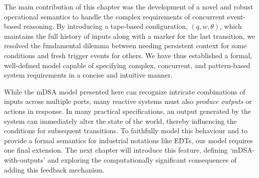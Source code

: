 The main contribution of this chapter was the development of a novel and robust operational semantics to handle the complex requirements of concurrent event-based reasoning. By introducing a tape-based configuration, $(q, w, \theta)$, which maintains the full history of inputs along with a marker for the last transition, we resolved the fundamental dilemma between needing persistent context for some conditions and fresh trigger events for others. We have thus established a formal, well-defined model capable of specifying complex, concurrent, and pattern-based system requirements in a concise and intuitive manner.

While the mDSA model presented here can recognize intricate combinations of inputs across multiple ports, many reactive systems must also \emph{produce outputs} or actions in response. In many practical specifications, an output generated by the system can immediately alter the state of the world, thereby influencing the conditions for subsequent transitions. To faithfully model this behaviour and to provide a formal semantics for industrial notations like EDTs, our model requires one final extension. The next chapter will introduce this feature, defining `mDSA-with-outputs' and exploring the computationally significant consequences of adding this feedback mechanism.






  
